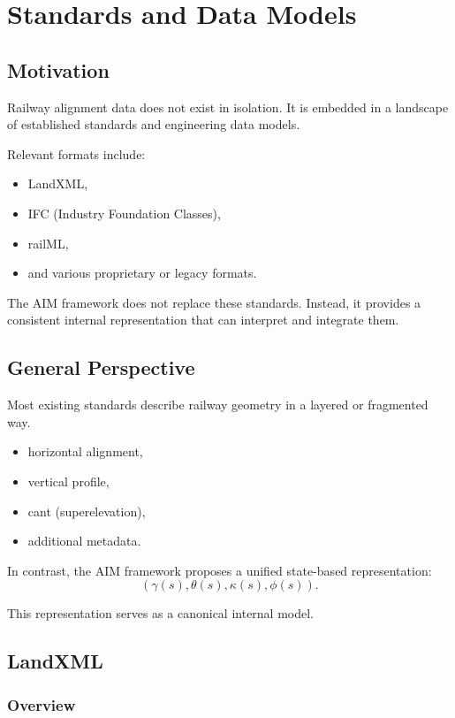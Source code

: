 \chapter{Standards and Data Models}

\section*{Motivation}

Railway alignment data does not exist in isolation. It is embedded in a
landscape of established standards and engineering data models.

Relevant formats include:
\begin{itemize}
\item LandXML,
\item IFC (Industry Foundation Classes),
\item railML,
\item and various proprietary or legacy formats.
\end{itemize}

The AIM framework does not replace these standards. Instead, it provides
a consistent internal representation that can interpret and integrate
them.


\section{General Perspective}

Most existing standards describe railway geometry in a layered or
fragmented way.

\begin{itemize}
\item horizontal alignment,
\item vertical profile,
\item cant (superelevation),
\item additional metadata.
\end{itemize}

In contrast, the AIM framework proposes a unified state-based
representation:
\[
(\gamma(s), \theta(s), \kappa(s), \phi(s)).
\]

This representation serves as a canonical internal model.


\section{LandXML}

\subsection{Overview}


